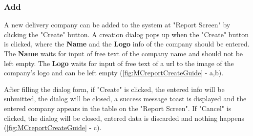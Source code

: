 \subsubsection{Add}

A new delivery company can be added to the system at "Report Screen" by clicking the "Create" button. 
A creation dialog pops up when the "Create" button is clicked, where the \textbf{Name} and the \textbf{Logo} info of the company should be entered. The \textbf{Name} waits for input of free text of the company name and should not be left empty. The \textbf{Logo} waits for input of free text of a url to the image of the company's logo and can be left empty (\autoref{fig:MCreportCreateGuide} - a,b). 

After filling the dialog form, if "Create" is clicked, the entered info will be submitted, the dialog will be closed, a success message toast is displayed and the entered company appears in the table on the "Report Screen". If "Cancel" is clicked, the dialog will be closed, entered data is discarded and nothing happens (\autoref{fig:MCreportCreateGuide} - c).

